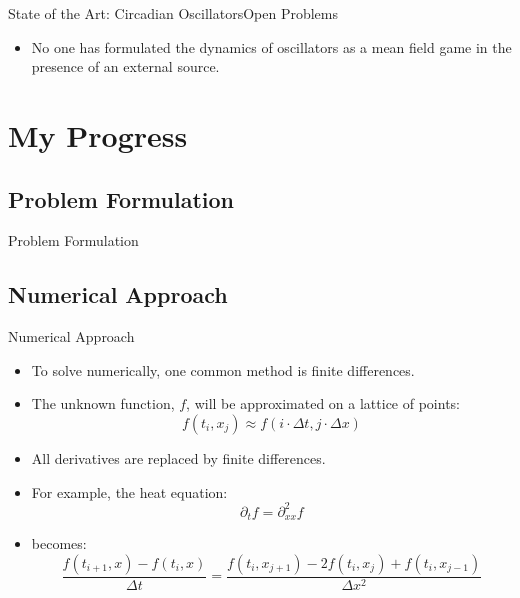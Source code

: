 \documentclass{beamer}
\begin{document}
\begin{frame}{State of the Art: Circadian Oscillators}{Open Problems}
	\begin{itemize}
		\item { No one has formulated the dynamics of oscillators as a mean field game in the presence of an external source.
		}
	\end{itemize}
\end{frame}

\section{My Progress}

\subsection{Problem Formulation}

\begin{frame}{Problem Formulation}

\end{frame}

\subsection{Numerical Approach}

\begin{frame}{Numerical Approach}
		\begin{itemize}
			\item {
				To solve numerically, one common method is finite differences.
			}
			\item {
				The unknown function, $f$, will be approximated on a lattice of points:
				\begin{equation}
				f(t_i,x_j) \approx f(i \cdot \Delta t,j \cdot \Delta x)
				\end{equation}
			}
			\item {
				All derivatives are replaced by finite differences.
			}
			\item {
				For example, the heat equation:
				\begin{equation}
				\partial_t f= \partial_{xx}^2 f
				\end{equation}
			}
			\item {
				becomes:
				\begin{equation}
				\frac{f(t_{i+1},x)-f(t_i,x)}{\Delta t}=\frac{f(t_i,x_{j+1})-2f(t_i,x_j)+f(t_i,x_{j-1})}{\Delta x^2}
				\end{equation}
			}
		\end{itemize}
\end{frame}
\end{document}
